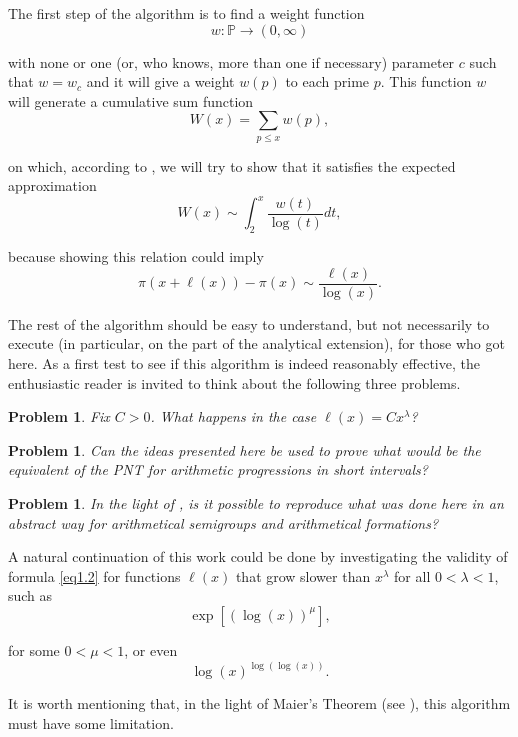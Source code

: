 \documentclass[11pt]{amsart}
\newtheorem{problem}[theorem]{Problem}
\numberwithin{equation}{section}
\newcommand{\PP}{\mathbb{P}}
\newcommand{\disum}{\displaystyle \sum}
\newcommand{\diint}{\displaystyle \int}
\newcommand{\difrac}{\displaystyle \frac}
\begin{document}
The first step of the algorithm is to find a weight function $$w: \PP \rightarrow (0, \infty)$$

\noindent with none or one (or, who knows, more than one if necessary) parameter $c$ such that $w = w_c$ and it will give a weight $w(p)$ to each prime $p$. This function $w$ will generate a cumulative sum function $$W(x) = \disum_{p \leq x} w(p),$$

\noindent on which, according to \cite{RS}, we will try to show that it satisfies the expected approximation $$W(x) \sim \diint_{2}^{x} \difrac{w(t)}{\log(t)} dt,$$

\noindent because showing this relation could imply $$\pi(x + \ell(x)) - \pi(x) \sim \difrac{\ell(x)}{\log(x)}.$$

The rest of the algorithm should be easy to understand, but not necessarily to execute (in particular, on the part of the analytical extension), for those who got here. As a first test to see if this algorithm is indeed reasonably effective, the enthusiastic reader is invited to think about the following three problems.

\begin{problem}

Fix $C > 0$. What happens in the case $\ell(x) = Cx^\lambda$?

\end{problem}

\begin{problem}

Can the ideas presented here be used to prove what would be the equivalent of the PNT for arithmetic progressions in short intervals?

\end{problem}

\begin{problem}

In the light of \cite{Knopfmacher}, is it possible to reproduce what was done here in an abstract way for arithmetical semigroups and arithmetical formations?

\end{problem}

A natural continuation of this work could be done by investigating the validity of formula \ref{eq1.2} for functions $\ell(x)$ that grow slower than $x^\lambda$ for all $0 < \lambda < 1$, such as $$\exp[(\log(x))^\mu],$$

\noindent for some $0 < \mu < 1$, or even $$\log(x)^{\log(\log(x))}.$$

It is worth mentioning that, in the light of Maier's Theorem (see \cite{Maier}), this algorithm must have some limitation.
\end{document}
